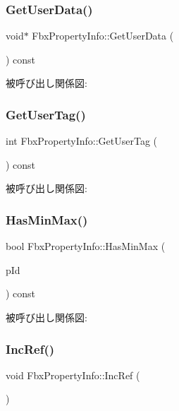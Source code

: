 \subsubsection{\texorpdfstring{Get\+User\+Data()}{GetUserData()}}
{\footnotesize\ttfamily void$\ast$ Fbx\+Property\+Info\+::\+Get\+User\+Data (\begin{DoxyParamCaption}{ }\end{DoxyParamCaption}) const}

被呼び出し関係図\+:
\mbox{\label{class_fbx_property_info_af756a4aefd06a0f57781a7c99cd8d133}} 
\subsubsection{\texorpdfstring{Get\+User\+Tag()}{GetUserTag()}}
{\footnotesize\ttfamily int Fbx\+Property\+Info\+::\+Get\+User\+Tag (\begin{DoxyParamCaption}{ }\end{DoxyParamCaption}) const}

被呼び出し関係図\+:
\mbox{\label{class_fbx_property_info_a1a65cdd1e8e312570977b7a394bb760f}} 
\subsubsection{\texorpdfstring{Has\+Min\+Max()}{HasMinMax()}}
{\footnotesize\ttfamily bool Fbx\+Property\+Info\+::\+Has\+Min\+Max (\begin{DoxyParamCaption}\item[{\hyperlink{class_fbx_property_info_a83069f079a29bde133f2e9324de5af43}{E\+Value\+Index}}]{p\+Id }\end{DoxyParamCaption}) const}

被呼び出し関係図\+:
\mbox{\label{class_fbx_property_info_afa1a32d32b37e32e4b1ff4977b3ee9ab}} 
\subsubsection{\texorpdfstring{Inc\+Ref()}{IncRef()}}
{\footnotesize\ttfamily void Fbx\+Property\+Info\+::\+Inc\+Ref (\begin{DoxyParamCaption}{ }\end{DoxyParamCaption})}

